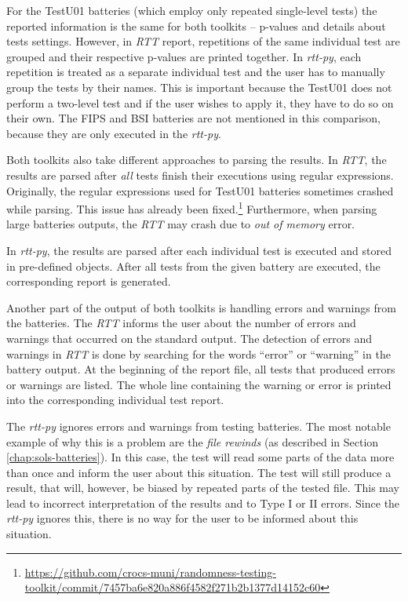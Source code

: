 \documentclass[
  digital,     %
  oneside,     %
  nosansbold,  %
  nocolorbold, %
  nolof,         %
  nolot,         %
]{fithesis4}
\begin{document}
For the TestU01 batteries (which employ only repeated single-level tests) the reported information is the same for both toolkits -- p-values and details about tests settings. However, in \emph{RTT} report, repetitions of the same individual test are grouped and their respective p-values are printed together. In \emph{rtt-py}, each repetition is treated as a separate individual test and the user has to manually group the tests by their names. This is important because the TestU01 does not perform a two-level test and if the user wishes to apply it, they have to do so on their own. The FIPS and BSI batteries are not mentioned in this comparison, because they are only executed in the \emph{rtt-py}.

Both toolkits also take different approaches to parsing the results. In \emph{RTT}, the results are parsed after \emph{all} tests finish their executions using regular expressions. Originally, the regular expressions used for TestU01 batteries sometimes crashed while parsing. This issue has already been fixed.\footnote{\url{https://github.com/crocs-muni/randomness-testing-toolkit/commit/7457ba6e820a886f4582f271b2b1377d14152c60}} Furthermore, when parsing large batteries outputs, the \emph{RTT} may crash due to \emph{out of memory} error.

In \emph{rtt-py}, the results are parsed after each individual test is executed and stored in pre-defined objects. After all tests from the given battery are executed, the corresponding report is generated.

Another part of the output of both toolkits is handling errors and warnings from the batteries. The \emph{RTT} informs the user about the number of errors and warnings that occurred on the standard output. The detection of errors and warnings in \emph{RTT} is done by searching for the words ``error'' or ``warning'' in the battery output. At the beginning of the report file, all tests that produced errors or warnings are listed. The whole line containing the warning or error is printed into the corresponding individual test report.

The \emph{rtt-py} ignores errors and warnings from testing batteries. The most notable example of why this is a problem are the \emph{file rewinds} (as described in Section \ref{chap:sols-batteries}). In this case, the test will read some parts of the data more than once and inform the user about this situation. The test will still produce a result, that will, however, be biased by repeated parts of the tested file. This may lead to incorrect interpretation of the results and to Type I or II errors. Since the \emph{rtt-py} ignores this, there is no way for the user to be informed about this situation.
 
\end{document}
